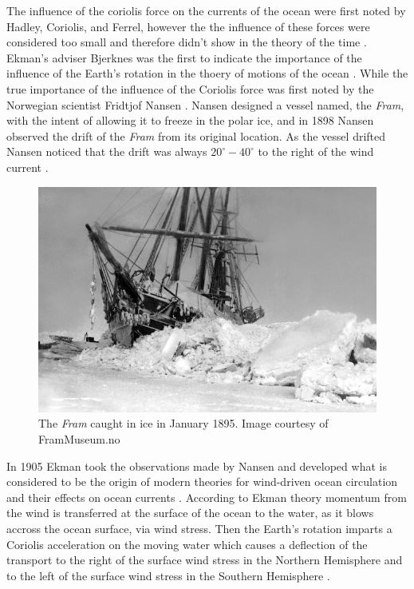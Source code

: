 The influence of the coriolis force on the currents of the ocean were first
noted by Hadley, Coriolis, and Ferrel, however the the influence of these forces
were considered too small and therefore didn't show in the theory of the time
\cite{Ekman1905}. Ekman's adviser Bjerknes was the first to indicate the
importance of the influence of the Earth's rotation in the thoery of motions of
the ocean \cite{Ekman1905}. While the true importance of the influence of the
Coriolis force was first noted by the Norwegian scientist Fridtjof Nansen
\cite{Beesley2008, Ekman1905}. Nansen designed a vessel named, the \emph{Fram},
with the intent of allowing it to freeze in the polar ice, and in 1898 Nansen
observed the drift of the \emph{Fram} from its original location. As the vessel
drifted Nansen noticed that the drift was always $20^\circ - 40^\circ$ to the
right of the wind current \cite{Beesley2008}.

\begin{figure}
  \includegraphics[scale=0.35]{Figures/Fram.jpg}
  \caption{The \emph{Fram} caught in ice in January 1895. Image courtesy of
  FramMuseum.no}
  \label{fig:Fram}
\end{figure}
In 1905 Ekman\cite{Ekman1905} took the observations made by Nansen and developed
what is considered to be the origin of modern theories for wind-driven ocean
circulation and their effects on ocean currents \cite{Price1987}. According to
Ekman theory momentum from the wind is transferred at the surface of the ocean
to the water, as it blows accross the ocean surface, via wind stress. Then the
Earth's rotation imparts a Coriolis acceleration on the moving water which
causes a deflection of the transport to the right of the surface wind stress in
the Northern Hemisphere and to the left of the surface wind stress in the
Southern Hemisphere \cite{Beesley2008}.


